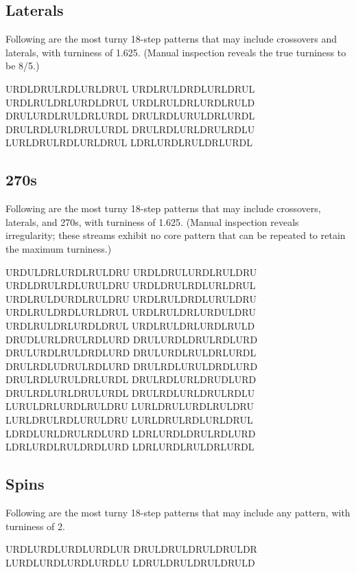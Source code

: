 \documentclass[10pt]{sigplanconf}
\begin{document}
\subsection{Laterals}

Following are the most turny 18-step patterns that may include crossovers and laterals, with turniness of 1.625. (Manual inspection reveals the true turniness to be 8/5.)

\noindent
URDLDRULRDLURLDRUL
URDLRULDRDLURLDRUL
URDLRULDRLURDLDRUL
URDLRULDRLURDLRULD
DRULURDLRULDRLURDL
DRULRDLURULDRLURDL
DRULRDLURLDRULURDL
DRULRDLURLDRULRDLU
LURLDRULRDLURLDRUL
LDRLURDLRULDRLURDL

\subsection{270s}

Following are the most turny 18-step patterns that may include crossovers, laterals, and 270s, with turniness of 1.625.
(Manual inspection reveals irregularity; these streams exhibit no core pattern that can be repeated to retain the maximum turniness.)

\noindent
URDULDRLURDLRULDRU
URDLDRULURDLRULDRU
URDLDRULRDLURULDRU
URDLDRULRDLURLDRUL
URDLRULDURDLRULDRU
URDLRULDRDLURULDRU
URDLRULDRDLURLDRUL
URDLRULDRLURDULDRU
URDLRULDRLURDLDRUL
URDLRULDRLURDLRULD
DRUDLURLDRULRDLURD
DRULURDLDRULRDLURD
DRULURDLRULDRDLURD
DRULURDLRULDRLURDL
DRULRDLUDRULRDLURD
DRULRDLURULDRDLURD
DRULRDLURULDRLURDL
DRULRDLURLDRUDLURD
DRULRDLURLDRULURDL
DRULRDLURLDRULRDLU
LURULDRLURDLRULDRU
LURLDRULURDLRULDRU
LURLDRULRDLURULDRU
LURLDRULRDLURLDRUL \\
LDRDLURLDRULRDLURD
LDRLURDLDRULRDLURD
LDRLURDLRULDRDLURD
LDRLURDLRULDRLURDL

\subsection{Spins}

Following are the most turny 18-step patterns that may include any pattern, with turniness of 2.

\noindent
URDLURDLURDLURDLUR
DRULDRULDRULDRULDR
LURDLURDLURDLURDLU
LDRULDRULDRULDRULD



\end{document}
